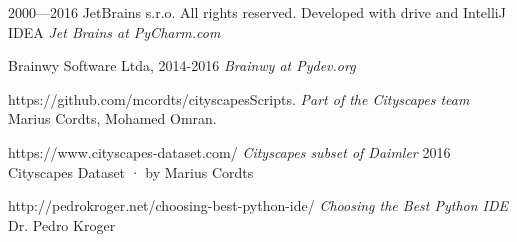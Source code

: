 \documentclass[10pt,draftclsnofoot,onecolumn,journal,compsoc]{IEEEtran}
\begin{document}
\newpage


\begin{thebibliography}{12}
 2000—2016 JetBrains s.r.o. All rights reserved. Developed with drive and IntelliJ IDEA
\textit{Jet Brains at PyCharm.com}

  Brainwy Software Ltda, 2014-2016
\textit{Brainwy at Pydev.org} 

 https://github.com/mcordts/cityscapesScripts.
\textit{Part of the Cityscapes team} Marius Cordts, Mohamed Omran.

 https://www.cityscapes-dataset.com/
\textit{Cityscapes subset of Daimler} 2016 Cityscapes Dataset · by Marius Cordts 

 http://pedrokroger.net/choosing-best-python-ide/
\textit{Choosing the Best Python IDE} Dr. Pedro Kroger

\end{thebibliography}
\end{document}
